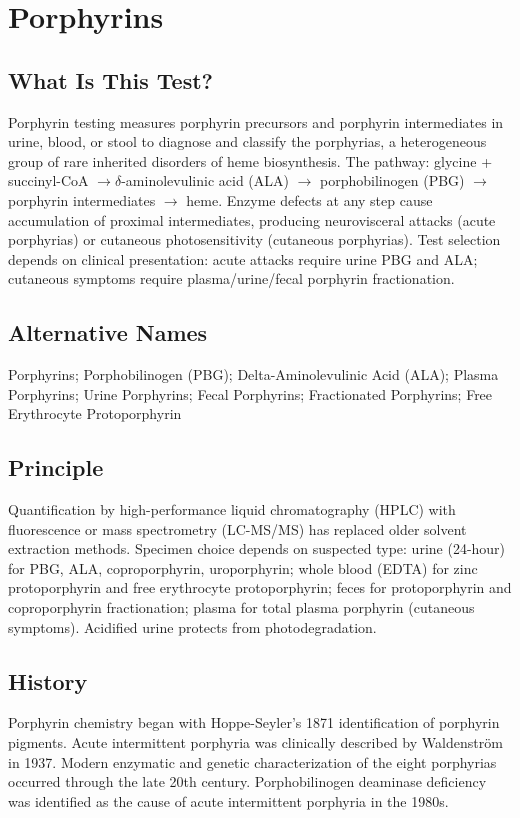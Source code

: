 \chapter{Porphyrins}

\section*{What Is This Test?}
Porphyrin testing measures porphyrin precursors and porphyrin intermediates in urine, blood, or stool to diagnose and classify the porphyrias, a heterogeneous group of rare inherited disorders of heme biosynthesis. The pathway: glycine + succinyl-CoA $\rightarrow \delta$-aminolevulinic acid (ALA) $\rightarrow$ porphobilinogen (PBG) $\rightarrow$ porphyrin intermediates $\rightarrow$ heme. Enzyme defects at any step cause accumulation of proximal intermediates, producing neurovisceral attacks (acute porphyrias) or cutaneous photosensitivity (cutaneous porphyrias). Test selection depends on clinical presentation: acute attacks require urine PBG and ALA; cutaneous symptoms require plasma/urine/fecal porphyrin fractionation.

\section*{Alternative Names}
Porphyrins; Porphobilinogen (PBG); Delta-Aminolevulinic Acid (ALA); Plasma Porphyrins; Urine Porphyrins; Fecal Porphyrins; Fractionated Porphyrins; Free Erythrocyte Protoporphyrin

\section*{Principle}
Quantification by high-performance liquid chromatography (HPLC) with fluorescence or mass spectrometry (LC-MS/MS) has replaced older solvent extraction methods. Specimen choice depends on suspected type: urine (24-hour) for PBG, ALA, coproporphyrin, uroporphyrin; whole blood (EDTA) for zinc protoporphyrin and free erythrocyte protoporphyrin; feces for protoporphyrin and coproporphyrin fractionation; plasma for total plasma porphyrin (cutaneous symptoms). Acidified urine protects from photodegradation.

\section*{History}
Porphyrin chemistry began with Hoppe-Seyler's 1871 identification of porphyrin pigments. Acute intermittent porphyria was clinically described by Waldenström in 1937. Modern enzymatic and genetic characterization of the eight porphyrias occurred through the late 20th century. Porphobilinogen deaminase deficiency was identified as the cause of acute intermittent porphyria in the 1980s.

